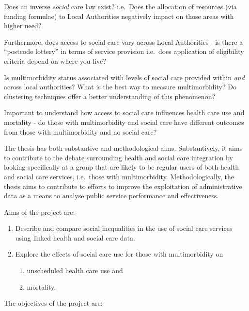 \documentclass[12pt,]{report}
\begin{document}
Does an inverse \emph{social} care law exist? i.e.~Does the allocation
of resources (via funding formulae) to Local Authorities negatively
impact on those areas with higher need?

Furthermore, does access to social care vary across Local Authorities -
is there a ``postcode lottery'' in terms of service provision i.e.~does
application of eligibility criteria depend on where you live?

Is multimorbidity status associated with levels of social care provided
within \emph{and} across local authorities? What is the best way to
measure multimorbidity? Do clustering techniques offer a better
understanding of this phenomenon?

Important to understand how access to social care influences health care
use and mortality - do those with multimorbidity and social care have
different outcomes from those with multimorbidity and no social care?

The thesis has both substantive and methodological aims. Substantively,
it aims to contribute to the debate surrounding health and social care
integration by looking specifically at a group that are likely to be
regular users of both health and social care services, i.e.~those with
multimorbidity. Methodologically, the thesis aims to contribute to
efforts to improve the exploitation of administrative data as a means to
analyse public service performance and effectiveness.

Aims of the project are:-

\begin{enumerate}[noitemsep]
\item Describe and compare social inequalities in the use of social care services using linked health and social care data.
\item Explore the effects of social care use for those with multimorbidity on 
\begin{enumerate} 
\item unscheduled health care use and
\item mortality. 
\end{enumerate}
\end{enumerate}

The objectives of the project are:-
\end{document}
